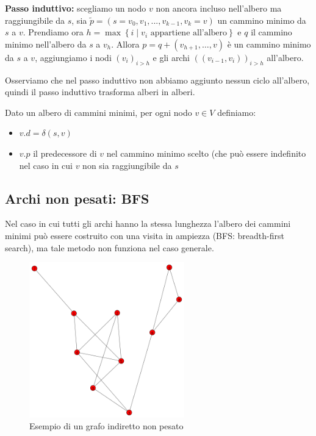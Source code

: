 \documentclass[a4paper,10pt]{amsbook}
\theoremstyle{plain}
\theoremstyle{definition}
\theoremstyle{remark}
\newcommand{\set}[1]{\left\{#1\right\}}
\newcommand{\pa}[1]{\left(#1\right)}
\begin{document}
\textbf{Passo induttivo:} scegliamo un nodo $v$ non ancora incluso
nell'albero ma raggiungibile da $s$, sia $\tilde p = (s=v_0,v_1,...,
v_{k-1}, v_k=v)$ un cammino minimo da $s$ a $v$. Prendiamo ora $h =
\max\set{ i \mid v_i \text{ appartiene all'albero}}$ e $q$ il cammino
minimo nell'albero da $s$ a $v_h$. Allora $p = q + (v_{h+1}, \dots ,
v)$ è un cammino minimo da $s$ a $v$, aggiungiamo i nodi $\pa{ v_i }
_{i>h}$ e gli archi $\pa{(v_{i-1},v_i)}_{i>h}$ all'albero.

Osserviamo che nel passo induttivo non abbiamo aggiunto nessun ciclo
all'albero, quindi il passo induttivo trasforma alberi in alberi.

Dato un albero di cammini minimi, per ogni nodo $v\in V$ definiamo:
\begin{itemize}
\item $v.d = \delta(s,v)$
\item $v.p$ il predecessore di $v$ nel cammino minimo scelto (che può
  essere indefinito nel caso in cui $v$ non sia raggiungibile da $s$
\end{itemize}

\subsection{Archi non pesati: BFS}

Nel caso in cui tutti gli archi hanno la stessa lunghezza l'albero dei
cammini minimi può essere costruito con una visita in ampiezza (BFS:
breadth-first search), ma tale metodo non funziona nel caso generale.

\begin{figure}[h]
  \centering
  \includegraphics[width=0.6\textwidth]{preBFS}
  \caption{Esempio di un grafo indiretto non pesato}
  \label{fig:preBFS}
\end{figure}
\end{document}

